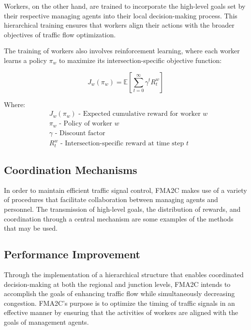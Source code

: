 Workers, on the other hand, are trained to incorporate the high-level goals set by their respective managing agents into their local decision-making process. This hierarchical training ensures that workers align their actions with the broader objectives of traffic flow optimization.

The training of workers also involves reinforcement learning, where each worker learns a policy \(\pi_w\) to maximize its intersection-specific objective function:

\[
J_w(\pi_w) = \mathbb{E}\left[\sum_{t=0}^{\infty} \gamma^t R_t^w\right]
\]

Where:
\begin{align*}
    &J_w(\pi_w) \text{ - Expected cumulative reward for worker } w\\
    &\pi_w \text{ - Policy of worker } w\\
    &\gamma \text{ - Discount factor}\\
    &R_t^w \text{ - Intersection-specific reward at time step } t
\end{align*}

\subsection{Coordination Mechanisms}

In order to maintain efficient traffic signal control, FMA2C makes use of a variety of procedures that facilitate collaboration between managing agents and personnel. The transmission of high-level goals, the distribution of rewards, and coordination through a central mechanism are some examples of the methods that may be used.

\subsection{Performance Improvement}

Through the implementation of a hierarchical structure that enables coordinated decision-making at both the regional and junction levels, FMA2C intends to accomplish the goals of enhancing traffic flow while simultaneously decreasing congestion. FMA2C's purpose is to optimize the timing of traffic signals in an effective manner by ensuring that the activities of workers are aligned with the goals of management agents.


